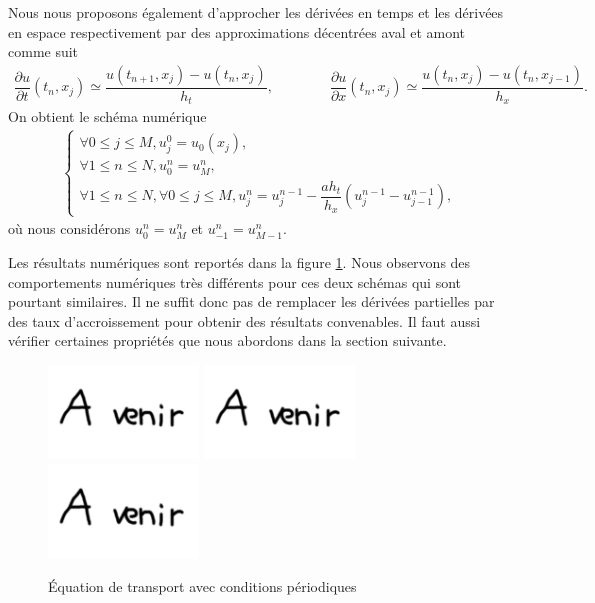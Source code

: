 \documentclass[12pt,a4paper,twoside]{article}
\begin{document}
Nous nous proposons \'egalement d'approcher les d\'eriv\'ees en temps et les d\'eriv\'ees
en espace respectivement par des approximations d\'ecentr\'ees aval et amont comme suit
\begin{align}
  \label{eq:der_decentre_AM}
  \dfrac{\partial u}{\partial t}(t_n,x_j) \simeq \dfrac{u(t_{n+1},x_j) - u(t_n,x_j)}{h_t} ,
  \qquad \qquad 
  \dfrac{\partial u}{\partial x}(t_n,x_j) \simeq \dfrac{u(t_n,x_{j}) - u(t_n,x_{j-1})}{h_x} .
\end{align}
On obtient le sch\'ema num\'erique
\begin{align}
  \label{eq:transport_DF_decentre_AM}
  \left\{
  \begin{array}{l}
    \forall 0 \leq j \leq M , 
    u_j^0 = u_0(x_j) ,
    \\
    \forall 1 \leq n \leq N, u_0^n = u_M^n ,
    \\
    \forall 1 \leq n \leq N, \forall 0 \leq j \leq M,
    u_j^n = u_j^{n-1} - \dfrac{a h_t}{h_x} (u_{j}^{n-1} - u_{j-1}^{n-1}) ,
  \end{array}
  \right.
\end{align}
o\`u nous consid\'erons $u_0^n = u_M^n$ et $u_{-1}^n = u_{M-1}^n$.

Les r\'esultats num\'eriques sont report\'es dans la
figure \ref{fig:trans_per}.
Nous observons des comportements num\'eriques tr\`es diff\'erents pour ces deux
sch\'emas qui sont pourtant similaires.
Il ne suffit donc pas de remplacer les d\'eriv\'ees partielles
par des taux d'accroissement pour obtenir des r\'esultats convenables.
Il faut aussi v\'erifier certaines propri\'et\'es que nous abordons dans
la section suivante.

\begin{figure}[h]
  \centering
  \includegraphics[width = 4cm]{Figures/A_venir.png}
  \includegraphics[width = 4cm]{Figures/A_venir.png}
  \includegraphics[width = 4cm]{Figures/A_venir.png}
  \caption{\'Equation de transport avec conditions p\'eriodiques}
  \label{fig:trans_per}
\end{figure}
\end{document}
